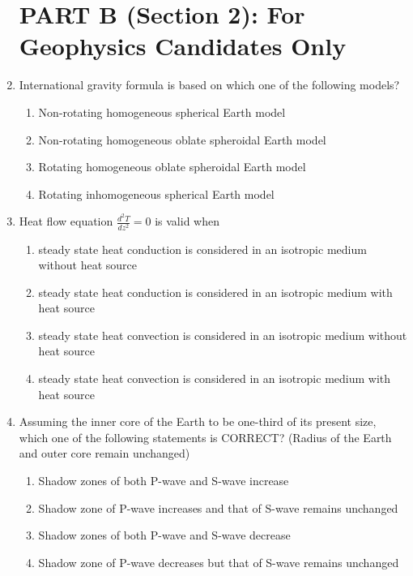 \documentclass[journal,12pt,onecolumn]{IEEEtran}
\begin{document}
\begin{enumerate}
\section*{PART B (Section 2): For Geophysics Candidates Only}



\item International gravity formula is based on which one of the following models?

\hfill{}
\begin{enumerate}
    \item Non-rotating homogeneous spherical Earth model
    \item Non-rotating homogeneous oblate spheroidal Earth model
    \item Rotating homogeneous oblate spheroidal Earth model
    \item Rotating inhomogeneous spherical Earth model
\end{enumerate}

\item Heat flow equation $\frac{d^2T}{dz^2} = 0$ is valid when \\


\hfill{}
\begin{enumerate}
    \item steady state heat conduction is considered in an isotropic medium without heat source
    \item steady state heat conduction is considered in an isotropic medium with heat source
    \item steady state heat convection is considered in an isotropic medium without heat source
    \item steady state heat convection is considered in an isotropic medium with heat source
\end{enumerate}

\item Assuming the inner core of the Earth to be one-third of its present size, which one of the following statements is CORRECT? (Radius of the Earth and outer core remain unchanged)

\hfill{}
\begin{enumerate}
    \item Shadow zones of both P-wave and S-wave increase
    \item Shadow zone of P-wave increases and that of S-wave remains unchanged
    \item Shadow zones of both P-wave and S-wave decrease
    \item Shadow zone of P-wave decreases but that of S-wave remains unchanged
\end{enumerate}


\end{enumerate}
\end{document}
